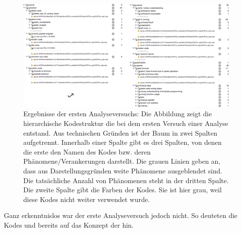 \begin{figure}
  \centering
    \includegraphics[width=1.0\linewidth]{Figures/research/ohne-sensibilisierung.png}
  \caption[Ergebnisse des ersten Analyseversuchs]{Ergebnisse der ersten Analyseversuchs: Die Abbildung zeigt die hierarchische Kodestruktur die bei dem ersten Versuch einer Analyse entstand. Aus technischen Gründen ist der Baum in zwei Spalten aufgetrennt. Innerhalb einer Spalte gibt es drei Spalten, von denen die erste den Namen des Kodes bzw. deren Phänomene/Verankerungen darstellt. Die grauen Linien geben an, dass aus Darstellungsgründen weite Phänomene ausgeblendet sind. Die tatsächliche Anzahl von Phänomenen steht in der dritten Spalte. Die zweite Spalte gibt die Farben der Kodes. Sie ist hier grau, weil diese Kodes nicht weiter verwendet wurde.}
  \label{fig:research-ohne-sensibilisierung}
\end{figure}

Ganz erkenntnislos war der erste Analyseversuch jedoch nicht. So deuteten die Kodes  und  bereits auf das Konzept der  hin.%


